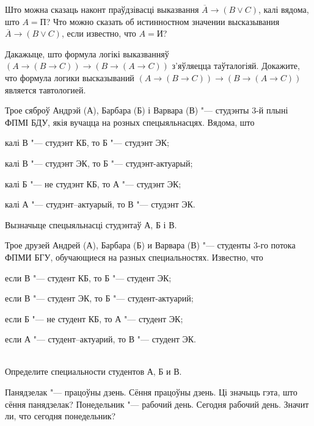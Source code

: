 \begin{problemList}

\problemItemSimple
{Што можна сказаць наконт праўдзівасці выказвання $\overline{A} \to (B \vee C)$, калі вядома, што $A = \mbox{П}$?}
{Что можно сказать об истинностном значении высказывания $\overline{A} \to (B \vee C)$, если известно, что $A = \mbox{И}$?}

\bigskip

\problemItemSimple
{Дакажыце, што формула логікі выказванняў $(A \to (B \to C)) \to (B \to (A \to C))$ з'яўляецца таўталогіяй.}
{Докажите, что формула логики высказываний $(A \to (B \to C)) \to (B \to (A \to C))$ является тавтологией.}

\bigskip

\problemItemSimple
{Трое сяброў Андрэй (А), Барбара (Б) і Варвара (В) "--- студэнты 3-й плыні ФПМІ БДУ, якія вучацца на розных спецыяльнасцях. Вядома, што
\begin{belarusianEnumerate}
	\item калі В "--- студэнт КБ, то Б "--- студэнт ЭК;
	\item калі В "--- студэнт ЭК, то Б "--- студэнт-актуарый;
	\item калі Б "--- не студэнт КБ, то А "--- студэнт ЭК;
	\item калі А "--- студэнт–актуарый, то В "--- студэнт ЭК.
\end{belarusianEnumerate}

Вызначыце спецыяльнасці студэнтаў А, Б і В.}
{Трое друзей Андрей (А), Барбара (Б) и Варвара (В) "--- студенты 3-го потока ФПМИ БГУ, обучающиеся на разных специальностях. Известно, что
\begin{russianEnumerate}
	\item если В "--- студент КБ, то Б "--- студент ЭК;
	\item если В "--- студент ЭК, то Б "--- студент-актуарий;
	\item если Б "--- не студент КБ, то А "--- студент ЭК;
	\item если А "--- студент–актуарий, то В "--- студент ЭК.
\end{russianEnumerate}\\
Определите специальности студентов А, Б и В.}

\bigskip

\problemItemSimple
{Панядзелак "--- працоўны дзень. Сёння працоўны дзень. Ці значыць гэта, што сёння панядзелак?}
{Понедельник "--- рабочий день. Сегодня рабочий день. Значит ли, что сегодня понедельник?}


\end{problemList}
